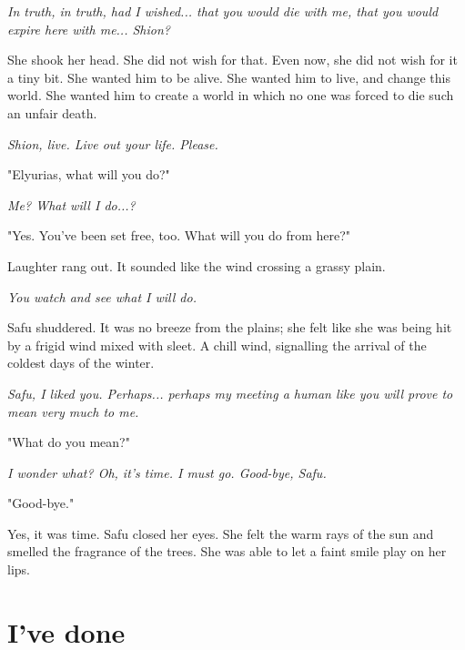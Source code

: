 \myspace

\emph{In truth, in truth, had I wished... that you would die with me, that you
	would expire here with me... Shion?}

She shook her head. She did not wish for that. Even now, she did not
wish for it a tiny bit. She wanted him to be alive. She wanted him to
live, and change this world. She wanted him to create a world in which
no one was forced to die such an unfair death.

\emph{Shion, live. Live out your life. Please.}

"Elyurias, what will you do?"

\myspace

\emph{Me? What will I do...?}

\myspace

"Yes. You've been set free, too. What will you do from here?"

Laughter rang out. It sounded like the wind crossing a grassy plain.

\myspace

\emph{You watch and see what I will do.}

\myspace

Safu shuddered. It was no breeze from the plains; she felt like she was
being hit by a frigid wind mixed with sleet. A chill wind, signalling
the arrival of the coldest days of the winter.

\myspace

\emph{Safu, I liked you. Perhaps... perhaps my meeting a human like you will
	prove to mean very much to me.}

\myspace

"What do you mean?"

\myspace

\emph{I wonder what? Oh, it's time. I must go. Good-bye, Safu.}

\myspace

"Good-bye."

Yes, it was time. Safu closed her eyes. She felt the warm rays of the
sun and smelled the fragrance of the trees. She was able to let a faint
smile play on her lips.

\chapter{I've done}


